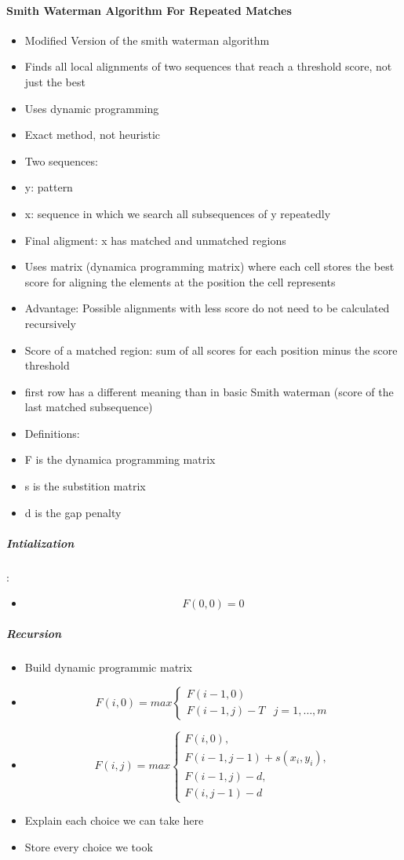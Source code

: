 \paragraph{Smith Waterman Algorithm For Repeated Matches}
\begin{itemize}
	\item Modified Version of the smith waterman algorithm
	\item Finds all local alignments of two sequences that reach a threshold score, not just the best
	\item Uses dynamic programming
	\item Exact method, not heuristic
	\item Two sequences: 
	\item y: pattern
	\item x: sequence in which we search all subsequences of y repeatedly
	\item Final aligment: x has matched and unmatched regions
	\item Uses matrix (dynamica programming matrix) where each cell stores the best score for aligning the elements at the position the cell represents
	\item Advantage: Possible alignments with less score do not need to be calculated recursively
	\item Score of a matched region: sum of all scores for each position minus the score threshold 
	\item first row has a different meaning than in basic Smith waterman (score of the last matched subsequence)
	\item Definitions:
	\item F is the dynamica programming matrix
	\item s is the substition matrix
	\item d is the gap penalty
\end{itemize}

\subparagraph{Intialization}:
	\begin{itemize}
		\item \[F(0,0) = 0\]
	\end{itemize}

\subparagraph{Recursion}
	\begin{itemize}
		\item Build dynamic programmic matrix
		\item  \[F(i,0) = max \left\{ \begin{array}{lr}F(i-1,0)&\\F(i-1,j)-T& j=1,\dots,m\end{array}\right. \]
		\item  \[F(i,j) = max \left\{ \begin{array}{lr}F(i,0),\\F(i-1,j-1)+s(x_i,y_i),\\F(i-1,j)-d,\\F(i,j-1)-d\end{array}\right.\]
		\item Explain each choice we can take here
		\item Store every choice we took
	\end{itemize}

